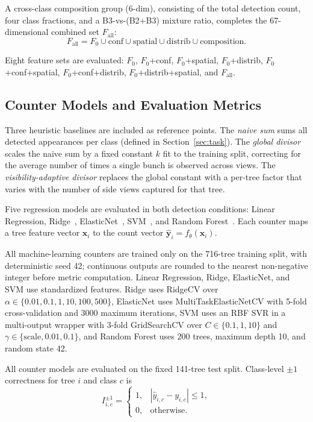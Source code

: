 ﻿\documentclass[conference]{IEEEtran}
\begin{document}
A cross-class composition group (6-dim), consisting of the total detection
count, four class fractions, and a B3-vs-(B2+B3) mixture ratio, completes the
67-dimensional combined set $F_{\text{all}}$:
\begin{equation*}
  F_{\text{all}} = F_0 \cup \text{conf} \cup \text{spatial}
                      \cup \text{distrib} \cup \text{composition}.
\end{equation*}

Eight feature sets are evaluated: $F_0$, $F_0$+conf, $F_0$+spatial,
$F_0$+distrib, $F_0$+conf+spatial, $F_0$+conf+distrib, $F_0$+distrib+spatial,
and $F_{\text{all}}$.

\subsection{Counter Models and Evaluation Metrics}

Three heuristic baselines are included as reference points. The \textit{naive
sum} sums all detected appearances per class (defined in
Section~\ref{sec:task}). The \textit{global divisor} scales the naive sum by
a fixed constant $k$ fit to the training split, correcting for the average
number of times a single bunch is observed across views. The
\textit{visibility-adaptive divisor} replaces the global constant with a
per-tree factor that varies with the number of side views captured for that
tree.

Five regression models are evaluated in both detection conditions: Linear
Regression, Ridge~\cite{ref19}, ElasticNet~\cite{ref17}, SVM~\cite{ref20}, and
Random Forest~\cite{ref18}. Each counter maps a tree feature vector
$\mathbf{x}_i$ to the count vector $\hat{\mathbf{y}}_i =
f_{\theta}(\mathbf{x}_i)$.

All machine-learning counters are trained only on the 716-tree training split,
with deterministic seed 42; continuous outputs are rounded to the nearest
non-negative integer before metric computation. Linear Regression, Ridge,
ElasticNet, and SVM use standardized features. Ridge uses RidgeCV over
$\alpha \in \{0.01,0.1,1,10,100,500\}$, ElasticNet uses MultiTaskElasticNetCV
with 5-fold cross-validation and 3000 maximum iterations, SVM uses an RBF SVR
in a multi-output wrapper with 3-fold GridSearchCV over
$C \in \{0.1,1,10\}$ and $\gamma \in \{\text{scale},0.01,0.1\}$, and Random
Forest uses 200 trees, maximum depth 10, and random state 42.

All counter models are evaluated on the fixed 141-tree test split. Class-level
$\pm 1$ correctness for tree $i$ and class $c$ is
\begin{equation}
  I_{i,c}^{\pm 1} =
  \begin{cases}
    1, & |\hat{y}_{i,c} - y_{i,c}| \leq 1, \\
    0, & \text{otherwise}.
  \end{cases}
\end{equation}
\end{document}
